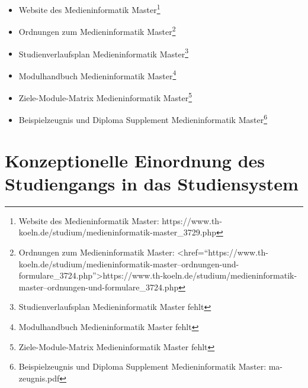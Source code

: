 \begin{itemize}
\tightlist
\item
  Website des Medieninformatik Master\footnote{Website des
    Medieninformatik Master:
    https://www.th-koeln.de/studium/medieninformatik-master\_3729.php}
\item
  Ordnungen zum Medieninformatik Master\footnote{Ordnungen zum
    Medieninformatik Master:
    \textless{}href=``https://www.th-koeln.de/studium/medieninformatik-master--ordnungen-und-formulare\_3724.php''\textgreater{}https://www.th-koeln.de/studium/medieninformatik-master--ordnungen-und-formulare\_3724.php}
\item
  Studienverlaufsplan Medieninformatik Master\footnote{Studienverlaufsplan
    Medieninformatik Master fehlt}
\item
  Modulhandbuch Medieninformatik Master\footnote{Modulhandbuch
    Medieninformatik Master fehlt}
\item
  Ziele-Module-Matrix Medieninformatik Master\footnote{Ziele-Module-Matrix
    Medieninformatik Master fehlt}
\item
  Beispielzeugnis und Diploma Supplement Medieninformatik
  Master\footnote{Beispielzeugnis und Diploma Supplement
    Medieninformatik Master: ma-zeugnis.pdf}
\end{itemize}

\chapter{Konzeptionelle Einordnung des Studiengangs in das
Studiensystem}\label{konzeptionelle-einordnung-des-studiengangs-in-das-studiensystem}

